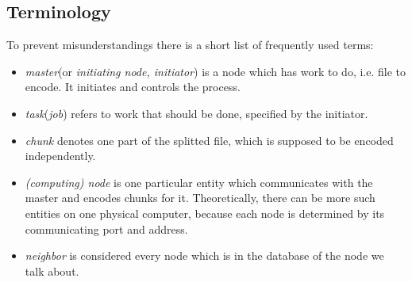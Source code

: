 \subsection*{Terminology}
To prevent misunderstandings there is a short list of frequently used terms:
\begin{itemize}
\item \textit{master}(or \textit{initiating node, initiator}) is a node which has work to do, i.e. file to encode. It initiates and controls the process.
\item \textit{task}(\textit{job}) refers to work that should be done, specified by the initiator.
\item \textit{chunk} denotes one part of the splitted file, which is supposed to be encoded independently.
\item \textit{(computing) node} is one particular entity which communicates with the master and encodes chunks for it. Theoretically, there can be more such entities on one physical computer, because each node is determined by its communicating port and address.
\item \textit{neighbor} is considered every node which is in the database of the node we talk about.
\end{itemize}